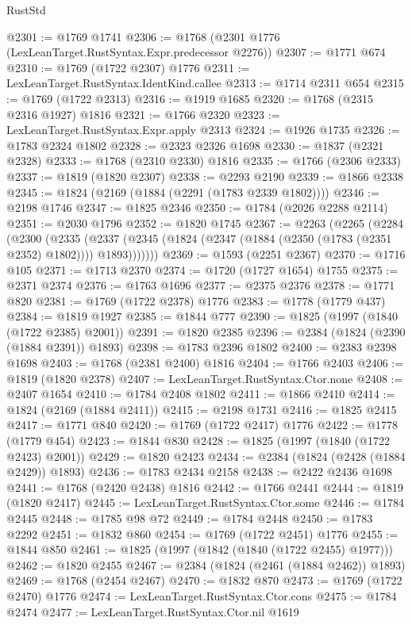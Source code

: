 \begin{lexlean}{RustStd}
\begin{coremodule}
@2301 := @1769 @1741
@2306 := @1768 (@2301 @1776 (LexLeanTarget.RustSyntax.Expr.predecessor @2276))
@2307 := @1771 @674
@2310 := @1769 (@1722 @2307) @1776
@2311 := LexLeanTarget.RustSyntax.IdentKind.callee
@2313 := @1714 @2311 @654
@2315 := @1769 (@1722 @2313)
@2316 := @1919 @1685
@2320 := @1768 (@2315 @2316 @1927) @1816
@2321 := @1766 @2320
@2323 := LexLeanTarget.RustSyntax.Expr.apply @2313
@2324 := @1926 @1735
@2326 := @1783 @2324 @1802
@2328 := @2323 @2326 @1698
@2330 := @1837 (@2321 @2328)
@2333 := @1768 (@2310 @2330) @1816
@2335 := @1766 (@2306 @2333)
@2337 := @1819 (@1820 @2307)
@2338 := @2293 @2190
@2339 := @1866 @2338
@2345 := @1824 (@2169 (@1884 (@2291 (@1783 @2339 @1802))))
@2346 := @2198 @1746
@2347 := @1825 @2346
@2350 := @1784 (@2026 @2288 @2114)
@2351 := @2030 @1796
@2352 := @1820 @1745
@2367 := @2263
    (@2265
      (@2284
        (@2300
          (@2335
            (@2337 (@2345 (@1824 (@2347 (@1884 (@2350 (@1783 (@2351 @2352) @1802)))) @1893)))))))
@2369 := @1593 (@2251 @2367)
@2370 := @1716 @105
@2371 := @1713 @2370
@2374 := @1720 (@1727 @1654) @1755
@2375 := @2371 @2374
@2376 := @1763 @1696
@2377 := @2375 @2376
@2378 := @1771 @820
@2381 := @1769 (@1722 @2378) @1776
@2383 := @1778 (@1779 @437)
@2384 := @1819 @1927
@2385 := @1844 @777
@2390 := @1825 (@1997 (@1840 (@1722 @2385) @2001))
@2391 := @1820 @2385
@2396 := @2384 (@1824 (@2390 (@1884 @2391)) @1893)
@2398 := @1783 @2396 @1802
@2400 := @2383 @2398 @1698
@2403 := @1768 (@2381 @2400) @1816
@2404 := @1766 @2403
@2406 := @1819 (@1820 @2378)
@2407 := LexLeanTarget.RustSyntax.Ctor.none
@2408 := @2407 @1654
@2410 := @1784 @2408 @1802
@2411 := @1866 @2410
@2414 := @1824 (@2169 (@1884 @2411))
@2415 := @2198 @1731
@2416 := @1825 @2415
@2417 := @1771 @840
@2420 := @1769 (@1722 @2417) @1776
@2422 := @1778 (@1779 @454)
@2423 := @1844 @830
@2428 := @1825 (@1997 (@1840 (@1722 @2423) @2001))
@2429 := @1820 @2423
@2434 := @2384 (@1824 (@2428 (@1884 @2429)) @1893)
@2436 := @1783 @2434 @2158
@2438 := @2422 @2436 @1698
@2441 := @1768 (@2420 @2438) @1816
@2442 := @1766 @2441
@2444 := @1819 (@1820 @2417)
@2445 := LexLeanTarget.RustSyntax.Ctor.some
@2446 := @1784 @2445
@2448 := @1785 @98 @72
@2449 := @1784 @2448
@2450 := @1783 @2292
@2451 := @1832 @860
@2454 := @1769 (@1722 @2451) @1776
@2455 := @1844 @850
@2461 := @1825 (@1997 (@1842 (@1840 (@1722 @2455) @1977)))
@2462 := @1820 @2455
@2467 := @2384 (@1824 (@2461 (@1884 @2462)) @1893)
@2469 := @1768 (@2454 @2467)
@2470 := @1832 @870
@2473 := @1769 (@1722 @2470) @1776
@2474 := LexLeanTarget.RustSyntax.Ctor.cons
@2475 := @1784 @2474
@2477 := LexLeanTarget.RustSyntax.Ctor.nil @1619

\end{coremodule}
\end{lexlean}
